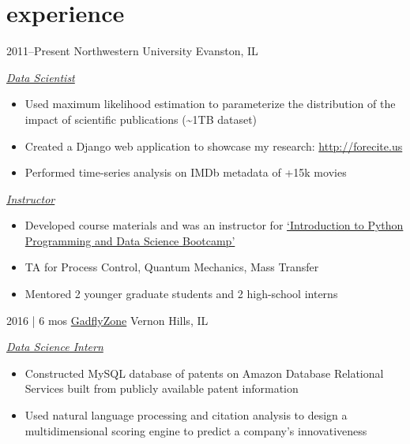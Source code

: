 
\section{experience}

\begin{entrylist}


\entry
{2011--Present}
{Northwestern University}
{Evanston, IL}
{\textit{\underline{Data Scientist}}\\
\begin{itemize}
\item Used maximum likelihood estimation to parameterize the distribution of the impact of scientific publications (\textasciitilde1TB dataset)
\item Created a Django web application to showcase my research: \href{http://forecite.us}{http://forecite.us}
\item Performed time-series analysis on IMDb metadata of +15k movies
\end{itemize}
\textit{\underline{Instructor}}\\
\begin{itemize}
\item Developed course materials and was an instructor for \href{https://amarallab.github.io/Introduction-to-Python-Programming-and-Data-Science/}{`Introduction to Python Programming and Data Science Bootcamp'}
\item TA for Process Control, Quantum Mechanics, Mass Transfer
\item Mentored 2 younger graduate students and 2 high-school interns
\end{itemize}}


\entry
{2016 | 6 mos}
{\href{http://gadflyzone.com/}{GadflyZone}}
{Vernon Hills, IL}
{\textit{\underline{Data Science Intern}}\\
\begin{itemize}
\item Constructed MySQL database of patents on Amazon Database Relational Services built from publicly available patent information
\item Used natural language processing and citation analysis to design a multidimensional scoring engine to predict a company's innovativeness
\end{itemize}}


\end{entrylist}
